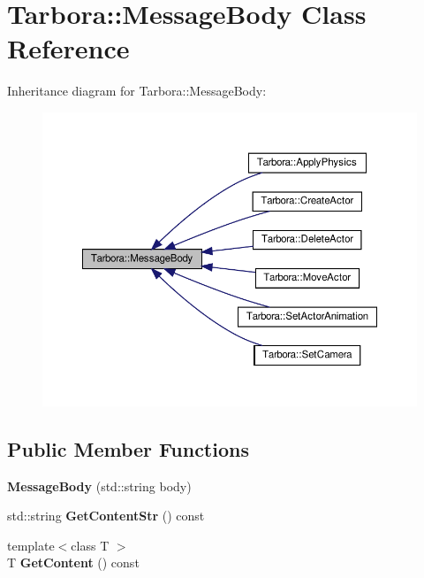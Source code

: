 \hypertarget{classTarbora_1_1MessageBody}{}\section{Tarbora\+:\+:Message\+Body Class Reference}
\label{classTarbora_1_1MessageBody}


Inheritance diagram for Tarbora\+:\+:Message\+Body\+:
\nopagebreak
\begin{figure}[H]
\begin{center}
\leavevmode
\includegraphics[width=350pt]{classTarbora_1_1MessageBody__inherit__graph}
\end{center}
\end{figure}
\subsection*{Public Member Functions}
\begin{DoxyCompactItemize}
\item 
\mbox{\label{classTarbora_1_1MessageBody_a4eb35d5c93039753ace8af2dac1a2078}} 
{\bfseries Message\+Body} (std\+::string body)
\item 
\mbox{\label{classTarbora_1_1MessageBody_a467839c6f4ef43a6f287282b1335f7ba}} 
std\+::string {\bfseries Get\+Content\+Str} () const
\item 
\mbox{\label{classTarbora_1_1MessageBody_af5d09e2631a506c48277daf9dc071c29}} 
{\footnotesize template$<$class T $>$ }\\T {\bfseries Get\+Content} () const
\end{DoxyCompactItemize}
